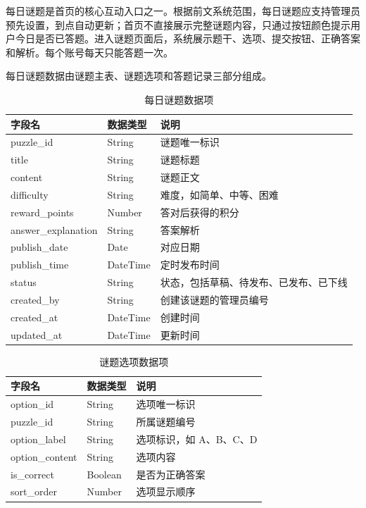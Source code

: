 \documentclass[a4paper,12pt]{article}
\begin{document}
每日谜题是首页的核心互动入口之一。根据前文系统范围，每日谜题应支持管理员预先设置，到点自动更新；首页不直接展示完整谜题内容，只通过按钮颜色提示用户今日是否已答题。进入谜题页面后，系统展示题干、选项、提交按钮、正确答案和解析。每个账号每天只能答题一次。

每日谜题数据由谜题主表、谜题选项和答题记录三部分组成。

\begin{longtable}{p{3.5cm}p{3cm}p{7cm}}
\caption{每日谜题数据项} \\
\toprule
字段名 & 数据类型 & 说明 \\
\midrule
puzzle\_id & String & 谜题唯一标识 \\
title & String & 谜题标题 \\
content & String & 谜题正文 \\
difficulty & String & 难度，如简单、中等、困难 \\
reward\_points & Number & 答对后获得的积分 \\
answer\_explanation & String & 答案解析 \\
publish\_date & Date & 对应日期 \\
publish\_time & DateTime & 定时发布时间 \\
status & String & 状态，包括草稿、待发布、已发布、已下线 \\
created\_by & String & 创建该谜题的管理员编号 \\
created\_at & DateTime & 创建时间 \\
updated\_at & DateTime & 更新时间 \\
\bottomrule
\end{longtable}

\begin{longtable}{p{3.5cm}p{3cm}p{7cm}}
\caption{谜题选项数据项} \\
\toprule
字段名 & 数据类型 & 说明 \\
\midrule
option\_id & String & 选项唯一标识 \\
puzzle\_id & String & 所属谜题编号 \\
option\_label & String & 选项标识，如 A、B、C、D \\
option\_content & String & 选项内容 \\
is\_correct & Boolean & 是否为正确答案 \\
sort\_order & Number & 选项显示顺序 \\
\bottomrule
\end{longtable}
\end{document}
